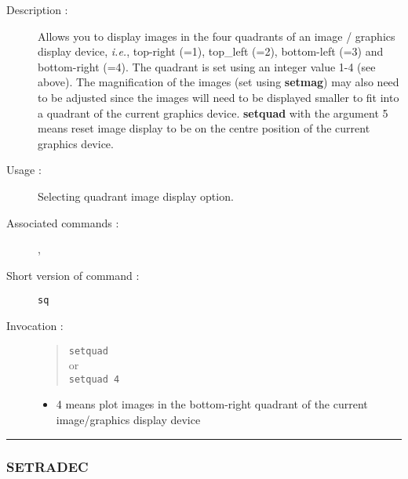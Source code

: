 \begin{description}

\item[Description :] Allows you to display images in the four
quadrants of an image / graphics display device, \emph{i.e.}, top-right
(=1), top\_left (=2), bottom-left (=3) and bottom-right (=4).  The
quadrant is set using an integer value 1-4 (see above).  The
magnification of the images (set using {\bf setmag}) may also need to
be adjusted since the images will need to be displayed smaller to fit
into a quadrant of the current graphics device.  {\bf setquad} with the
argument 5 means reset image display to be on the centre position of
the current graphics device.

\item[Usage :] Selecting quadrant image display option.

\item[Associated commands :] {\tt {}},
{\tt {}}

\item[Short version of command :] {\tt sq}
\item[Invocation :]

\begin{quote}{\tt  setquad }\\
or \\
{\tt setquad 4 }
\end{quote}

\begin{itemize}

\item 4 means plot images in the bottom-right quadrant of the
 current image/graphics display device
\end{itemize}

\end{description}

\hrule
\subsubsection*{\label{SETRADEC}SETRADEC}

